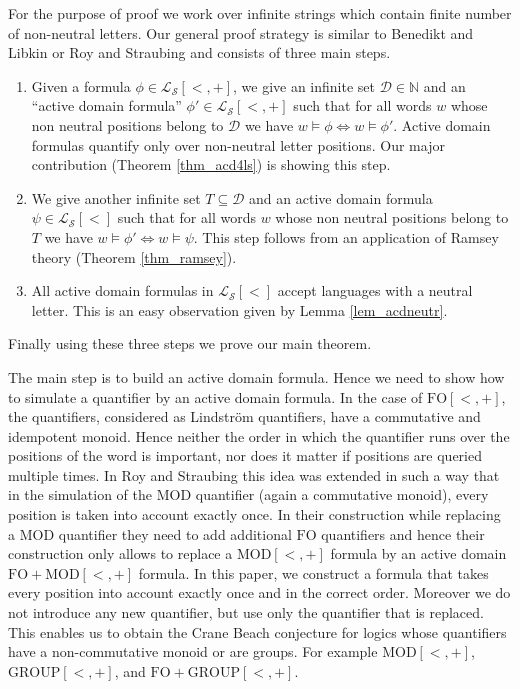 \documentclass[envcountsame]{llncs}
\newcommand{\Nat}{\mathbb{N}}
\newcommand{\FO}{\mathrm{FO}}
\newcommand{\GROUP}{\mathrm{GROUP}}
\newcommand{\MOD}{\mathrm{MOD}}
\begin{document}
For the purpose of proof we work over infinite strings which contain finite number of non-neutral letters. 
Our general proof strategy is similar to Benedikt and Libkin \cite{libkin_relIntrStruc} or Roy and Straubing \cite{roy_defGenFO} and consists of three main steps.
\begin{enumerate}
 \item Given a formula $\phi \in \mathcal{L_S}[<,+]$, we give an infinite set $\mathcal{D} \in \Nat$ and an ``active domain formula'' $\phi' \in \mathcal{L_S}[<,+]$ such that for all words $w$ whose non neutral positions belong to $\mathcal{D}$ we have 
 $w \vDash \phi \Leftrightarrow w \vDash \phi'$.
 Active domain formulas quantify only over non-neutral letter positions. Our major contribution (Theorem \ref{thm_acd4ls}) is  showing
 this step.  
 \item We give another infinite set $T \subseteq \mathcal{D}$ and an active domain formula $\psi \in \mathcal{L_S}[<]$ such that for all words $w$ whose non neutral positions belong to $T$ we have 
 $w \vDash \phi' \Leftrightarrow w \vDash \psi$.
 This step follows from an application of Ramsey theory (Theorem \ref{thm_ramsey}).
 \item All active domain formulas in $\mathcal{L_S}[<]$ accept languages with a neutral letter. This is an easy observation given by Lemma \ref{lem_acdneutr}.
\end{enumerate}
Finally using these three steps we prove our main theorem.

The main step is to build an active domain formula. Hence we need to show how to simulate a quantifier by an active domain formula.
In the case of $\FO[<,+]$, the quantifiers, considered as Lindstr\"om quantifiers, have a commutative and idempotent monoid. Hence
neither the order in which the quantifier runs over the positions of the word is important, nor does it matter if positions are queried
multiple times.
In Roy and Straubing this idea was extended in such a way that in the simulation of the $\MOD$ quantifier (again a commutative monoid),
every position is taken into account exactly once. In their construction while replacing a $\MOD$ quantifier they need to add
additional $\FO$ quantifiers and hence their construction only allows to replace a $\MOD[<,+]$ formula by an active domain $\FO+\MOD[<,+]$ formula.
In this paper, we construct a formula that takes every position into account exactly once and in
the correct order. Moreover we do not introduce any new quantifier, but use only the quantifier that is replaced.
This enables us to obtain the Crane Beach conjecture for logics whose quantifiers have a non-commutative monoid or are groups. For
example $\MOD[<,+]$, $\GROUP[<,+]$, and $\FO+\GROUP[<,+]$.
\end{document}
